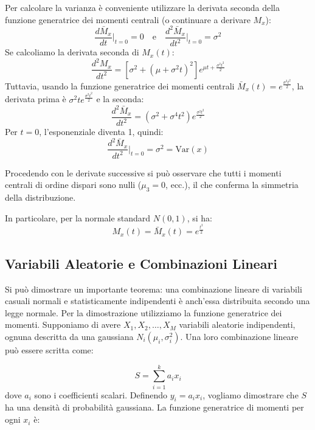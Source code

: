 \documentclass{article}
\theoremstyle{remark}
\begin{document}
Per calcolare la varianza è conveniente utilizzare la derivata seconda della funzione generatrice dei momenti centrali (o continuare a derivare $M_x$):
\begin{equation}
\frac{d \bar{M}_x}{dt} \bigg\rvert_{t=0} = 0 \quad \text{e} \quad \frac{d^2 \bar{M}_x}{dt^2} \bigg\rvert_{t=0} = \sigma^2
\end{equation}
Se calcoliamo la derivata seconda di $M_x(t)$:
\begin{equation}
\frac{d^2 M_x}{dt^2} = \left[ \sigma^2 + (\mu + \sigma^2 t)^2 \right] e^{\mu t + \frac{\sigma^2 t^2}{2}}
\end{equation}
Tuttavia, usando la funzione generatrice dei momenti centrali $\bar{M}_x(t) = e^{\frac{\sigma^2 t^2}{2}}$, la derivata prima è $\sigma^2 t e^{\frac{\sigma^2 t^2}{2}}$ e la seconda:
\begin{equation}
\frac{d^2 \bar{M}_x}{dt^2} = (\sigma^2 + \sigma^4 t^2) e^{\frac{\sigma^2 t^2}{2}}
\end{equation}
Per $t=0$, l'esponenziale diventa 1, quindi:
\begin{equation}
\frac{d^2 \bar{M}_x}{dt^2} \bigg\rvert_{t=0} = \sigma^2 = \text{Var}(x)
\end{equation}

Procedendo con le derivate successive si può osservare che tutti i momenti centrali di ordine dispari sono nulli ($\mu_3 = 0$, ecc.), il che conferma la simmetria della distribuzione.

In particolare, per la normale standard $N(0,1)$, si ha:
\begin{equation}
M_x(t) = \bar{M}_x(t) = e^{\frac{t^2}{2}}
\end{equation}

\subsection{Variabili Aleatorie e Combinazioni Lineari}

Si può dimostrare un importante teorema: una combinazione lineare di variabili casuali normali e statisticamente indipendenti è anch'essa distribuita secondo una legge normale.
Per la dimostrazione utilizziamo la funzione generatrice dei momenti. Supponiamo di avere $X_1, X_2, \dots, X_M$ variabili aleatorie indipendenti, ognuna descritta da una gaussiana $N_i(\mu_i, \sigma_i^2)$. Una loro combinazione lineare può essere scritta come:

\begin{equation}
S = \sum_{i=1}^{k} a_i x_i
\end{equation}
dove $a_i$ sono i coefficienti scalari.
Definendo $y_i= a_i x_i$, vogliamo dimostrare che $S$ ha una densità di probabilità gaussiana.
La funzione generatrice di momenti per ogni $x_i$ è:
\end{document}
